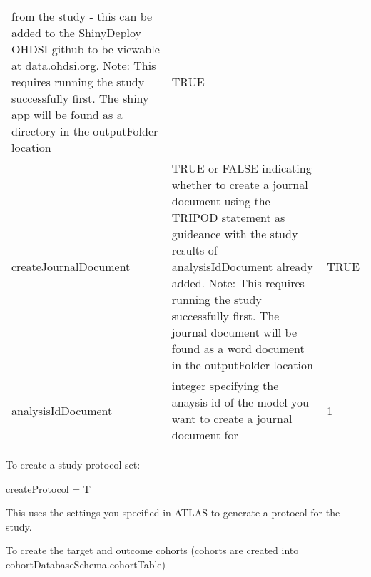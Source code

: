 \documentclass[
]{article}
\newenvironment{Shaded}{\begin{snugshade}}{\end{snugshade}}
\newcommand{\NormalTok}[1]{#1}
\newcommand{\StringTok}[1]{\textcolor[rgb]{0.31,0.60,0.02}{#1}}
\begin{document}
\begin{longtable}[]{@{}lll@{}}
\begin{minipage}[t]{0.46\columnwidth}
from the study - this can be added to the ShinyDeploy OHDSI github to be
viewable at data.ohdsi.org. Note: This requires running the study
successfully first. The shiny app will be found as a directory in the
outputFolder location\strut
\end{minipage} & \begin{minipage}[t]{0.24\columnwidth}\raggedright
TRUE\strut
\end{minipage}\tabularnewline
\begin{minipage}[t]{0.21\columnwidth}\raggedright
createJournalDocument\strut
\end{minipage} & \begin{minipage}[t]{0.46\columnwidth}\raggedright
TRUE or FALSE indicating whether to create a journal document using the
TRIPOD statement as guideance with the study results of
analysisIdDocument already added. Note: This requires running the study
successfully first. The journal document will be found as a word
document in the outputFolder location\strut
\end{minipage} & \begin{minipage}[t]{0.24\columnwidth}\raggedright
TRUE\strut
\end{minipage}\tabularnewline
\begin{minipage}[t]{0.21\columnwidth}\raggedright
analysisIdDocument\strut
\end{minipage} & \begin{minipage}[t]{0.46\columnwidth}\raggedright
integer specifying the anaysis id of the model you want to create a
journal document for\strut
\end{minipage} & \begin{minipage}[t]{0.24\columnwidth}\raggedright
1\strut
\end{minipage}\tabularnewline
\bottomrule
\end{longtable}

To create a study protocol set:

\begin{Shaded}
\begin{Highlighting}[]
\NormalTok{    createProtocol =}\StringTok{ }\NormalTok{T}
\end{Highlighting}
\end{Shaded}

This uses the settings you specified in ATLAS to generate a protocol for
the study.

To create the target and outcome cohorts (cohorts are created into
cohortDatabaseSchema.cohortTable)
\end{document}

